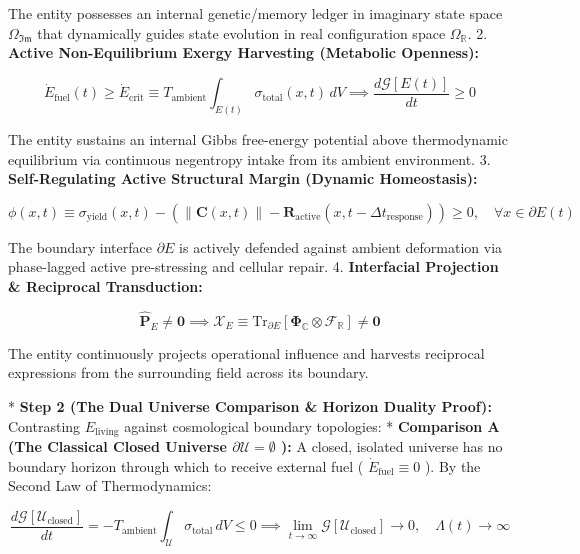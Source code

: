 \documentclass[11pt,a4paper]{article}
\theoremstyle{definition}
\theoremstyle{remark}
\begin{document}
The entity possesses an internal genetic/memory ledger in imaginary state space $\Omega_{\mathfrak{Im}}$ that dynamically guides state evolution in real configuration space $\Omega_{\mathbb{R}}$.
2. \textbf{Active Non-Equilibrium Exergy Harvesting (Metabolic Openness):}


\begin{equation}
\boxed{\dot{E}_{\text{fuel}}(t) \ge \dot{E}_{\text{crit}} \equiv T_{\text{ambient}} \int_{E(t)} \sigma_{\text{total}}(x, t) \, dV \implies \frac{d\mathcal{G}[E(t)]}{dt} \ge 0}
\end{equation}


The entity sustains an internal Gibbs free-energy potential above thermodynamic equilibrium via continuous negentropy intake from its ambient environment.
3. \textbf{Self-Regulating Active Structural Margin (Dynamic Homeostasis):}


\begin{equation}
\boxed{\phi(x, t) \equiv \sigma_{\text{yield}}(x, t) - \left( \|\mathbf{C}(x, t)\| - \mathbf{R}_{\text{active}}(x, t - \Delta t_{\text{response}}) \right) \ge 0, \quad \forall x \in \partial E(t)}
\end{equation}


The boundary interface $\partial E$ is actively defended against ambient deformation via phase-lagged active pre-stressing and cellular repair.
4. \textbf{Interfacial Projection \& Reciprocal Transduction:}


\begin{equation}
\boxed{\hat{\mathbf{P}}_E \neq \mathbf{0} \implies \boldsymbol{\mathcal{X}}_E \equiv \mathrm{Tr}_{\partial E}[ \mathbf{\Phi}_{\mathbb{C}} \otimes \mathcal{F}_{\mathbb{R}} ] \neq \mathbf{0}}
\end{equation}


The entity continuously projects operational influence and harvests reciprocal expressions from the surrounding field across its boundary.

* \textbf{Step 2 (The Dual Universe Comparison \& Horizon Duality Proof):}
Contrasting $E_{\text{living}}$ against cosmological boundary topologies:
* \textbf{Comparison A (The Classical Closed Universe $\partial \mathcal{U} = \emptyset$ ):}
A closed, isolated universe has no boundary horizon through which to receive external fuel ( $\dot{E}_{\text{fuel}} \equiv 0$ ). By the Second Law of Thermodynamics:


\begin{equation}
\frac{d\mathcal{G}[\mathcal{U}_{\text{closed}}]}{dt} = -T_{\text{ambient}} \int_{\mathcal{U}} \sigma_{\text{total}} \, dV \le 0 \implies \lim_{t \to \infty} \mathcal{G}[\mathcal{U}_{\text{closed}}] \to 0, \quad \Lambda(t) \to \infty
\end{equation}
\end{document}
